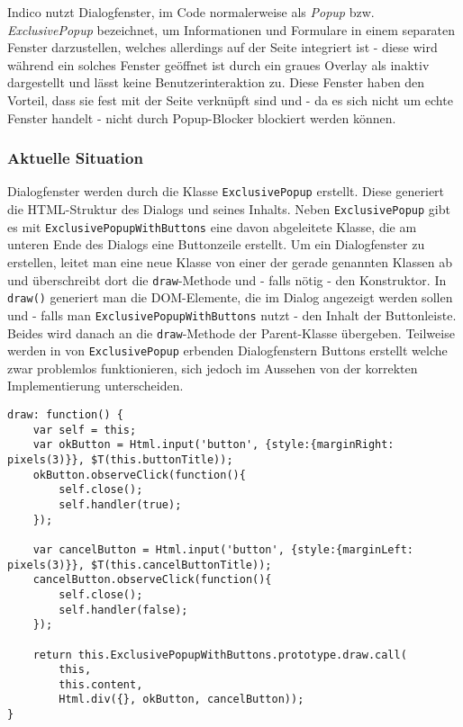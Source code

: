 Indico nutzt Dialogfenster, im Code normalerweise als \emph{Popup} bzw. \emph{ExclusivePopup}
bezeichnet, um Informationen und Formulare in einem separaten Fenster darzustellen, welches
allerdings auf der Seite integriert ist - diese wird während ein solches Fenster geöffnet ist durch
ein graues Overlay als inaktiv dargestellt und lässt keine Benutzerinteraktion zu. Diese Fenster
haben den Vorteil, dass sie fest mit der Seite verknüpft sind und - da es sich nicht um echte
Fenster handelt - nicht durch Popup-Blocker blockiert werden können.

\subsubsection{Aktuelle Situation}

Dialogfenster werden durch die Klasse \lstinline{ExclusivePopup} erstellt. Diese generiert die
HTML-Struktur des Dialogs und seines Inhalts. Neben \lstinline{ExclusivePopup} gibt es mit
\lstinline{ExclusivePopupWithButtons} eine davon abgeleitete Klasse, die am unteren Ende des
Dialogs eine Buttonzeile erstellt. Um ein Dialogfenster zu erstellen, leitet man eine neue Klasse
von einer der gerade genannten Klassen ab und überschreibt dort die \lstinline{draw}-Methode und -
falls nötig - den Konstruktor. In \lstinline{draw()} generiert man die DOM-Elemente, die im Dialog
angezeigt werden sollen und - falls man \lstinline{ExclusivePopupWithButtons} nutzt - den Inhalt der
Buttonleiste. Beides wird danach an die \lstinline{draw}-Methode der Parent-Klasse übergeben.
Teilweise werden in von \lstinline{ExclusivePopup} erbenden Dialogfenstern Buttons erstellt welche
zwar problemlos funktionieren, sich jedoch im Aussehen von der korrekten Implementierung
unterscheiden.

\begin{lstlisting}[label=lst:confirmpopup-old,caption=Indico-Code zum Erstellen eines simplen Dialogfensters]
draw: function() {
    var self = this;
    var okButton = Html.input('button', {style:{marginRight: pixels(3)}}, $T(this.buttonTitle));
    okButton.observeClick(function(){
        self.close();
        self.handler(true);
    });

    var cancelButton = Html.input('button', {style:{marginLeft: pixels(3)}}, $T(this.cancelButtonTitle));
    cancelButton.observeClick(function(){
        self.close();
        self.handler(false);
    });

    return this.ExclusivePopupWithButtons.prototype.draw.call(
        this,
        this.content,
        Html.div({}, okButton, cancelButton));
}
\end{lstlisting}

